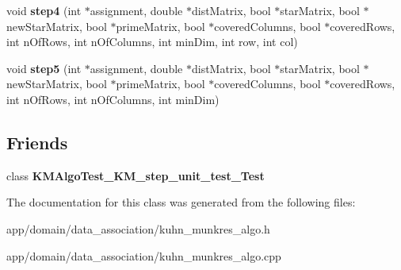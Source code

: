 \begin{DoxyCompactItemize}
void {\bfseries step4} (int $\ast$assignment, double $\ast$dist\+Matrix, bool $\ast$star\+Matrix, bool $\ast$new\+Star\+Matrix, bool $\ast$prime\+Matrix, bool $\ast$covered\+Columns, bool $\ast$covered\+Rows, int n\+Of\+Rows, int n\+Of\+Columns, int min\+Dim, int row, int col)
\item 
\mbox{\label{classKMAlgorithm_aa0fa316130b57cc56c578ac07a8ccf39}} 
void {\bfseries step5} (int $\ast$assignment, double $\ast$dist\+Matrix, bool $\ast$star\+Matrix, bool $\ast$new\+Star\+Matrix, bool $\ast$prime\+Matrix, bool $\ast$covered\+Columns, bool $\ast$covered\+Rows, int n\+Of\+Rows, int n\+Of\+Columns, int min\+Dim)
\end{DoxyCompactItemize}
\subsection*{Friends}
\begin{DoxyCompactItemize}
\item 
\mbox{\label{classKMAlgorithm_a35cfc555d92e7b7675cf40d3bda3b56b}} 
class {\bfseries K\+M\+Algo\+Test\+\_\+\+K\+M\+\_\+step\+\_\+unit\+\_\+test\+\_\+\+Test}
\end{DoxyCompactItemize}


The documentation for this class was generated from the following files\+:\begin{DoxyCompactItemize}
\item 
app/domain/data\+\_\+association/kuhn\+\_\+munkres\+\_\+algo.\+h\item 
app/domain/data\+\_\+association/kuhn\+\_\+munkres\+\_\+algo.\+cpp\end{DoxyCompactItemize}
